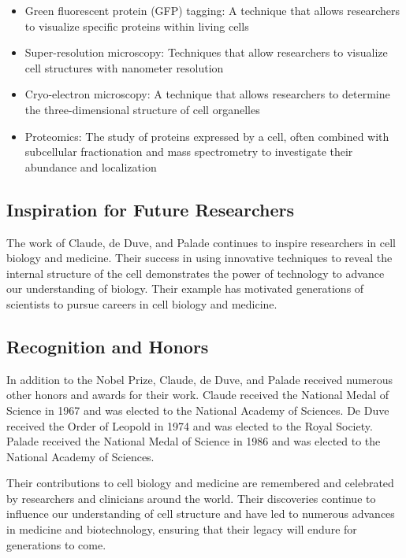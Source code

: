 \begin{itemize}
\item Green fluorescent protein (GFP) tagging: A technique that allows researchers to visualize specific proteins within living cells
\item Super-resolution microscopy: Techniques that allow researchers to visualize cell structures with nanometer resolution
\item Cryo-electron microscopy: A technique that allows researchers to determine the three-dimensional structure of cell organelles
\item Proteomics: The study of proteins expressed by a cell, often combined with subcellular fractionation and mass spectrometry to investigate their abundance and localization
\end{itemize}

\subsection{Inspiration for Future Researchers}

The work of Claude, de Duve, and Palade continues to inspire researchers in cell biology and medicine. Their success in using innovative techniques to reveal the internal structure of the cell demonstrates the power of technology to advance our understanding of biology. Their example has motivated generations of scientists to pursue careers in cell biology and medicine.

\subsection{Recognition and Honors}

In addition to the Nobel Prize, Claude, de Duve, and Palade received numerous other honors and awards for their work. Claude received the National Medal of Science in 1967 and was elected to the National Academy of Sciences. De Duve received the Order of Leopold in 1974 and was elected to the Royal Society. Palade received the National Medal of Science in 1986 and was elected to the National Academy of Sciences.

Their contributions to cell biology and medicine are remembered and celebrated by researchers and clinicians around the world. Their discoveries continue to influence our understanding of cell structure and have led to numerous advances in medicine and biotechnology, ensuring that their legacy will endure for generations to come.


